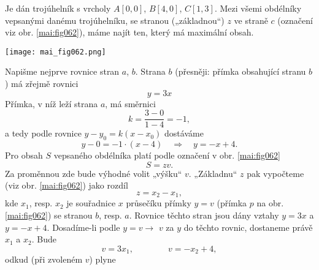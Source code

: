 \begin{mdframed}[style=mdexam]
  \begin{example}\label{teo:exam092}
    Je dán trojúhelník s vrcholy \(A[0, 0]\), \(B[4, 0]\), \(C[1, 3]\). Mezi všemi obdélníky
    vepsanými danému trojúhelníku, se stranou („základnou“) \(z\) ve straně \(c\) (označení viz obr.
    \ref{mai:fig062}), máme najít ten, který má maximální obsah.

    {\centering
      \captionsetup{type=figure}
      \texttt{[image: mai\_fig062.png]} 
      \label{mai:fig062}
    \par}
    
    Napišme nejprve rovnice stran \(a\), \(b\). Strana \(b\) (přesněji: přímka obsahující stranu
    \(b\)) má zřejmě rovnici
    \begin{equation*}
      y = 3x
    \end{equation*}
    Přímka, v níž leží strana \(a\), má směrnici
    \begin{equation*}
      k = \dfrac{3-0}{1-4} = -1,
    \end{equation*}
    a tedy podle rovnice \(y-y_0 = k(x-x_0)\) dostáváme 
    \begin{equation*}
      y - 0 = -1\cdot(x - 4) \quad\Rightarrow\quad y = -x + 4.  
    \end{equation*}
    Pro obsah \(S\) vepsaného obdélníka platí podle označení v obr. \ref{mai:fig062} 
    \begin{equation*}
      S = zv.
    \end{equation*}
    Za proměnnou zde bude výhodné volit „výšku“ \(v\). „Základnu“ \(z\) pak vypočteme (viz obr.
    \ref{mai:fig062}) jako rozdíl
    \begin{equation}\label{mai:eq087}
      z = x_2 - x_1,
    \end{equation}
    kde \(x_1\), resp. \(x_2\) je souřadnice \(x\) průsečíku přímky \(y = v\) (přímka \(p\) na obr.
    \ref{mai:fig062}) se stranou \(b\), resp. \(a\). Rovnice těchto stran jsou dány vztahy \(y =
    3x\) a \(y = -x + 4\). Dosadíme-li podle \(y = v\rightarrow\)  \(v\) za \(y\) do těchto rovnic,
    dostaneme právě \(x_1\) a \(x_2\). Bude
    \begin{equation*}
      v = 3x_1, \qquad\qquad v = -x_2 + 4,
    \end{equation*}
    odkud (při zvoleném \(v\)) plyne
    \begin{equation*}

\end{equation*}
\end{example}
\end{mdframed}
